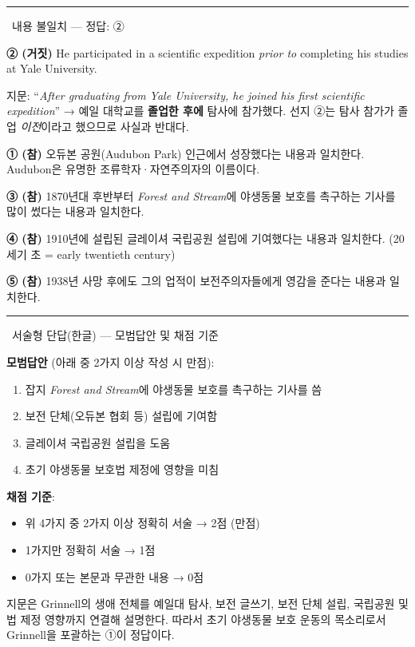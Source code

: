 \documentclass[11pt,a4paper]{article}
\newcommand{\qno}[1]{\par\vspace{10pt}\noindent{\sffamily\bfseries #1.}\ }
\begin{document}
\vspace{8pt}
\hrule
\vspace{8pt}

\qno{2}{\sffamily 내용 불일치 — 정답: ②}

\vspace{4pt}
\noindent\textbf{② (거짓)} He participated in a scientific expedition \textit{prior to} completing his studies at Yale University.

\noindent 지문: ``\textit{After graduating from Yale University, he joined his first scientific expedition}''
→ 예일 대학교를 \textbf{졸업한 후에} 탐사에 참가했다. 선지 ②는 탐사 참가가 졸업 \textit{이전}이라고 했으므로 사실과 반대다.

\vspace{6pt}
\noindent\textbf{① (참)} 오듀본 공원(Audubon Park) 인근에서 성장했다는 내용과 일치한다. Audubon은 유명한 조류학자·자연주의자의 이름이다.

\noindent\textbf{③ (참)} 1870년대 후반부터 \textit{Forest and Stream}에 야생동물 보호를 촉구하는 기사를 많이 썼다는 내용과 일치한다.

\noindent\textbf{④ (참)} 1910년에 설립된 글레이셔 국립공원 설립에 기여했다는 내용과 일치한다. (20세기 초 = early twentieth century)

\noindent\textbf{⑤ (참)} 1938년 사망 후에도 그의 업적이 보전주의자들에게 영감을 준다는 내용과 일치한다.

\vspace{8pt}
\hrule
\vspace{8pt}

\qno{3}{\sffamily 서술형 단답(한글) — 모범답안 및 채점 기준}

\vspace{4pt}
\noindent\textbf{모범답안} (아래 중 2가지 이상 작성 시 만점):
\begin{enumerate}[leftmargin=2em, itemsep=3pt]
  \item 잡지 \textit{Forest and Stream}에 야생동물 보호를 촉구하는 기사를 씀
  \item 보전 단체(오듀본 협회 등) 설립에 기여함
  \item 글레이셔 국립공원 설립을 도움
  \item 초기 야생동물 보호법 제정에 영향을 미침
\end{enumerate}

\vspace{4pt}
\noindent\textbf{채점 기준}:
\begin{itemize}[leftmargin=2em, itemsep=2pt]
  \item 위 4가지 중 2가지 이상 정확히 서술 → 2점 (만점)
  \item 1가지만 정확히 서술 → 1점
  \item 0가지 또는 본문과 무관한 내용 → 0점
\end{itemize}

\vspace{8pt}
\par 지문은 Grinnell의 생애 전체를 예일대 탐사, 보전 글쓰기, 보전 단체 설립, 국립공원 및 법 제정 영향까지 연결해 설명한다. 따라서 초기 야생동물 보호 운동의 목소리로서 Grinnell을 포괄하는 ①이 정답이다.
\end{document}
